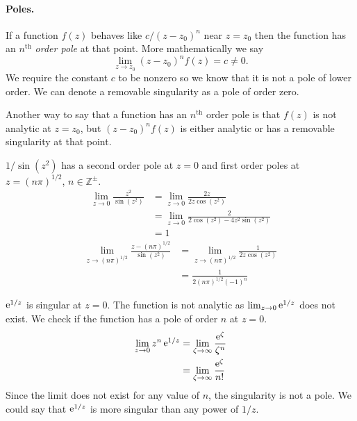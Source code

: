 \paragraph{Poles.}
If a function $f(z)$ behaves like $c / \left( z - z_0 \right)^n$ 
near $z = z_0$ then 
the function has an $n^{\mathrm{th}}$ \textit{order pole} at that point.  More
mathematically we say
\[
\lim_{z \to z_0} \left( z - z_0 \right)^n f(z) = c \neq 0.
\]
We require the constant $c$ to be nonzero so we know that it is not a pole
of lower order.  We can denote a removable singularity as a pole of order 
zero.

Another way to say that a function has an $n^{\mathrm{th}}$ order pole is that
$f(z)$ is not analytic at $z = z_0$, but $\left( z - z_0 \right)^n f(z)$ 
is either analytic or has a removable singularity at that point.



\begin{Example}
  $1 / \sin \left( z^2 \right)$ has a second order pole at $z = 0$ 
  and first order poles
  at $z = (n \pi)^{1/2}$, $n \in \mathbb{Z}^{\pm}$.
  \begin{align*}
    \lim_{z \to 0} \frac{ z^2 }{ \sin\left( z^2 \right) }
    &= \lim_{z \to 0} \frac{ 2 z }{ 2 z \cos\left( z^2 \right) } 
    \\
    &= \lim_{z \to 0} \frac{ 2 }{ 2 \cos\left( z^2 \right) 
      - 4 z^2 \sin\left( z^2 \right) } 
    \\
    &= 1
  \end{align*}
  \begin{align*}
    \lim_{z \to (n \pi)^{1/2}} \frac{ z - (n \pi)^{1/2} }{ \sin\left( z^2 \right) }
    &=\lim_{z \to (n \pi)^{1/2}} \frac{ 1 }{ 2 z \cos\left( z^2 \right) } 
    \\
    &= \frac{ 1 }{ 2 (n \pi)^{1/2} (-1)^n }
  \end{align*}
\end{Example}







\begin{Example}
  $\mathop{\mathrm{e}}\nolimits^{1/z}$ is singular at $z = 0$.  The function is not analytic as
  $\lim_{z \to 0} \mathop{\mathrm{e}}\nolimits^{1/z}$ does not exist.  We check if the function has a pole of 
  order $n$ at $z = 0$.
  \begin{align*}
    \lim_{z \to 0} z^n \mathop{\mathrm{e}}\nolimits^{1/z}
    &= \lim_{\zeta \to \infty} \frac{\mathop{\mathrm{e}}\nolimits^\zeta}{\zeta^n} 
    \\
    &= \lim_{\zeta \to \infty} \frac{\mathop{\mathrm{e}}\nolimits^\zeta}{n!}
  \end{align*}
  Since the limit does not exist for any value of $n$, the singularity is not 
  a pole.  We could say that $\mathop{\mathrm{e}}\nolimits^{1/z}$ is more singular than any power of
  $1 / z$.
\end{Example}



